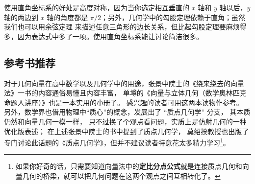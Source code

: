 使用直角坐标系的好处是高度对称，因为当你选定相互垂直的 $x$ 轴和 $y$ 轴以后，$y$ 轴的两边到 $x$ 轴的角度都是 $\pi/2$；另外，几何学中的勾股定理依赖于直角；虽然我们也可以用余弦定理%
来描述任意三角形的边长关系，但比起勾股定理要麻烦得多，因为表达式中多了一项。使用直角坐标系能让讨论简洁很多。

\subsection{参考书推荐}
对于几何向量在高中数学以及几何学中的用途，张景中院士的《绕来绕去的向量法》一书的内容通俗易懂且内容丰富， 单墫的《向量与立体几何（数学奥林匹克命题人讲座）》也是一本实用的小册子。 感兴趣的读者可用这两本读物作参考。 另外，数学界也借用物理中“质心”的概念，发展出了 “质点几何学” 分支， 其本质仍然和向量几何一模一样， 只不过换了个观点看问题，实质上是仿射几何的一种优化版表述； 在上述张景中院士的书中提到了质点几何学， 莫绍揆教授也出版了专门讨论此话题的《质点几何学》，但并不建议读者特意花太多精力学习\footnote{如果你好奇的话，只需要知道向量法中的\textbf{定比分点公式}就是连接质点几何和向量几何的桥梁，就可以把几何问题在这两个观点之间互相转化了。}。
